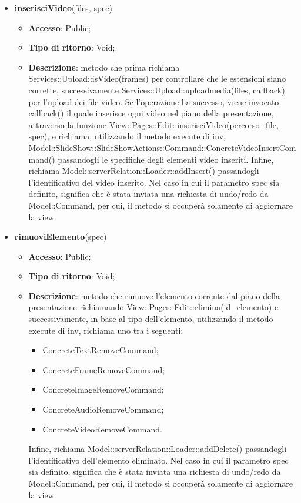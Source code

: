 {{\begin{itemize}
\begin{itemize}
		\end{itemize}
		\item \textbf{inserisciVideo}(files, spec)
		\begin{itemize}
			\item \textbf{Accesso}: Public;
			\item \textbf{Tipo di ritorno}: Void;
			\item \textbf{Descrizione}: metodo che prima richiama Services::\-Upload::\-isVideo(frames) per controllare che le estensioni siano corrette, successivamente Services::\-Upload::\-uploadmedia(files, callback) per l'upload dei file video. Se l'operazione ha successo, viene invocato callback() il quale inserisce ogni video nel piano della presentazione, attraverso la funzione View::Pages::Edit::inserisciVideo(percorso_file, spec), e richiama, utilizzando il metodo execute di inv, Model::\-SlideShow::\-SlideShowActions::\-Command::\-ConcreteVideoInsertCommand() passandogli le specifiche degli elementi video inseriti. Infine, richiama Model::\-serverRelation::\-Loader::\-addInsert() passandogli l'identificativo del video inserito. Nel caso in cui il parametro spec sia definito, significa che è stata inviata una richiesta di undo/redo da Model::\-Command, per cui, il metodo si occuperà solamente di aggiornare la view.
		\end{itemize}
		\item \textbf{rimuoviElemento}(spec)
		\begin{itemize}
			\item \textbf{Accesso}: Public;
			\item \textbf{Tipo di ritorno}: Void;
			\item \textbf{Descrizione}: metodo che rimuove l'elemento corrente dal piano della presentazione richiamando View::Pages::Edit::elimina(id_elemento) e successivamente, in base al tipo dell'elemento, utilizzando il metodo execute di inv, richiama uno tra i seguenti:
			\begin{itemize}
				\item ConcreteTextRemoveCommand;
				\item ConcreteFrameRemoveCommand;
				\item ConcreteImageRemoveCommand;
				\item ConcreteAudioRemoveCommand;
				\item ConcreteVideoRemoveCommand.
			\end{itemize}
			 Infine, richiama Model::\-serverRelation::\-Loader::\-addDelete() passandogli l'identificativo dell'elemento eliminato. Nel caso in cui il parametro spec sia definito, significa che è stata inviata una richiesta di undo/redo da Model::\-Command, per cui, il metodo si occuperà solamente di aggiornare la view.

\end{itemize}
\end{itemize}}}
